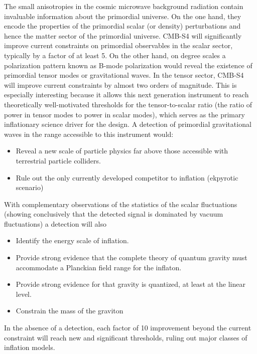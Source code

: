 The small anisotropies in the cosmic microwave background radiation contain invaluable information about the primordial universe. On the one hand, they encode the properties of the primordial scalar (or density) perturbations and hence the matter sector of the primordial universe. 
CMB-S4 will significantly improve current constraints on primordial observables in the scalar sector, typically by a factor of at least 5. On the other hand, on degree scales a polarization pattern known as B-mode polarization would reveal the existence of primordial tensor modes or gravitational waves. In the tensor sector, CMB-S4 will improve current constraints by almost two orders of magnitude. This is especially interesting because it allows this next generation instrument to reach theoretically well-motivated thresholds for the tensor-to-scalar ratio (the ratio of power in tensor modes to power in scalar modes), which serves as the primary inflationary science driver for the design. A detection of primordial gravitational waves in the range accessible to this instrument would:
\begin{itemize}
 \item Reveal a new scale of particle physics far above those accessible with terrestrial particle colliders.  
\item  Rule out the only currently developed competitor to inflation (ekpyrotic scenario)
\end{itemize}
With complementary observations of the statistics of the scalar fluctuations (showing conclusively that the detected signal is dominated by vacuum fluctuations) a detection will also
\begin{itemize}
 \item Identify the energy scale of inflation. 
 \item Provide strong evidence that the complete theory of quantum gravity must accommodate a Planckian field range for the inflaton.
 \item Provide strong evidence for that gravity is quantized, at least at the linear level.
\item  Constrain the mass of the graviton
\end{itemize}
In the absence of a detection, each factor of 10 improvement beyond the current constraint will reach new and significant thresholds, ruling out major classes of inflation models. 

